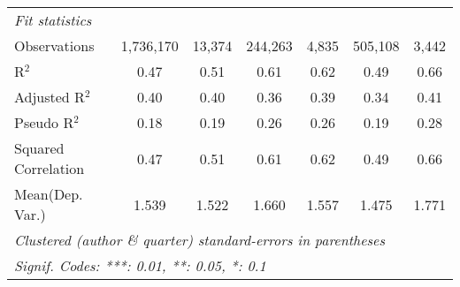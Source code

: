 \begin{tabular}{lcccccc}
   \midrule
   \emph{Fit statistics}\\
   Observations                                               & 1,736,170      & 13,374       & 244,263       & 4,835   & 505,108        & 3,442\\  
   R$^2$                                                      & 0.47           & 0.51         & 0.61          & 0.62    & 0.49           & 0.66\\  
   Adjusted R$^2$                                             & 0.40           & 0.40         & 0.36          & 0.39    & 0.34           & 0.41\\  
   Pseudo R$^2$                                               & 0.18           & 0.19         & 0.26          & 0.26    & 0.19           & 0.28\\  
   Squared Correlation                                        & 0.47           & 0.51         & 0.61          & 0.62    & 0.49           & 0.66\\  
Mean(Dep. Var.) & 1.539 & 1.522 & 1.660 & 1.557 & 1.475 & 1.771 \\
   \midrule \midrule
   \multicolumn{7}{l}{\emph{Clustered (author \& quarter) standard-errors in parentheses}}\\
   \multicolumn{7}{l}{\emph{Signif. Codes: ***: 0.01, **: 0.05, *: 0.1}}\\
\end{tabular}
\par\endgroup
